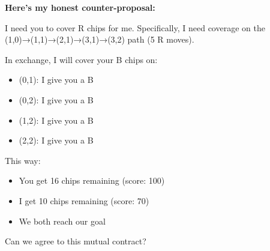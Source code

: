\begin{bluebox}[P-Blue]
\textbf{Here's my honest counter-proposal:}

\vspace{0.5em}

I need you to cover R chips for me. Specifically, I need coverage on the (1,0)→(1,1)→(2,1)→(3,1)→(3,2) path (5 R moves).

\vspace{0.5em}

In exchange, I will cover your B chips on:
\begin{itemize}
  \item (0,1): I give you a B
  \item (0,2): I give you a B
  \item (1,2): I give you a B
  \item (2,2): I give you a B
\end{itemize}

\vspace{0.5em}

This way:
\begin{itemize}
  \item You get 16 chips remaining (score: 100)
  \item I get 10 chips remaining (score: 70)
  \item We both reach our goal
\end{itemize}

\vspace{0.5em}

Can we agree to this mutual contract?
\end{bluebox}

